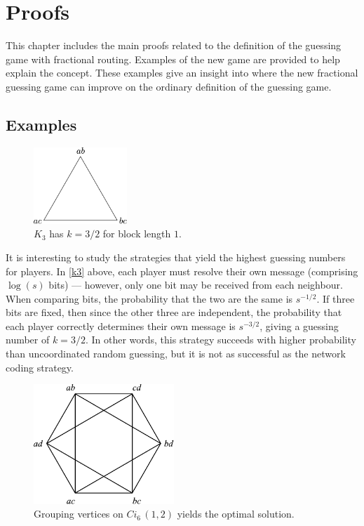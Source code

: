 
\chapter{Proofs}
\label{ch:sol}

This chapter includes the main proofs related to the definition of the guessing game with fractional routing. Examples of the new game are provided to help explain the concept. These examples give an insight into where the new fractional guessing game can improve on the ordinary definition of the guessing game.

\section{Examples}

\begin{figure}[ht]
	\centering
	\includegraphics[width=100pt]{figures/k3.pdf}
	\caption[Resolving messages on $K_3$]{$K_3$ has $k = 3/2$ for block length $1$.}
  \label{k3}
\end{figure}

It is interesting to study the strategies that yield the highest guessing numbers for players. In \autoref{k3} above, each player must resolve their own message (comprising $\log(s)$ bits) --- however, only one bit may be received from each neighbour. When comparing bits, the probability that the two are the same is $s^{-1/2}$. If three bits are fixed, then since the other three are independent, the probability that each player correctly determines their own message is $s^{-3/2}$, giving a guessing number of $k = 3/2$. In other words, this strategy succeeds with higher probability than uncoordinated random guessing, but it is not as successful as the network coding strategy.

\begin{figure}[ht]
	\centering
	\includegraphics[width=150pt]{figures/n6.pdf}
	\caption[Optimal solutions by grouping vertices]{Grouping vertices on $Ci_6 \, (1, 2)$ yields the optimal solution.}
	\label{n6}
\end{figure}

